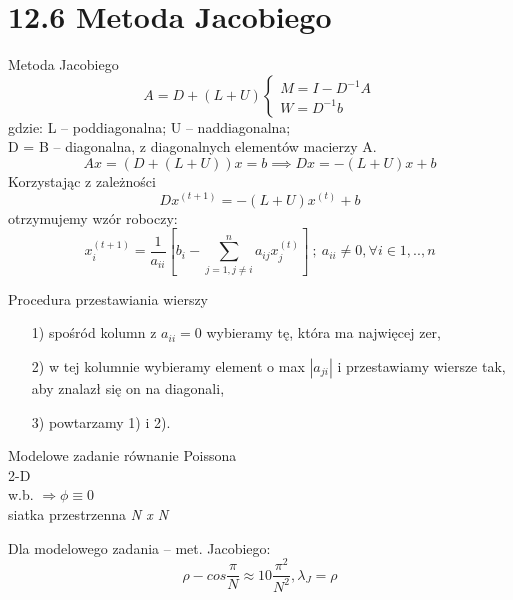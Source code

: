 \section{12.6 Metoda Jacobiego}

\begin{frame}{Metoda Jacobiego}
  $$
  A = D + (L+U)
  \begin{cases}
  M=I-D^{-1}A\\
  W=D^{-1}b
  \end{cases}
  $$
  gdzie: L -- poddiagonalna; U -- naddiagonalna;\\
  D = B -- diagonalna, z diagonalnych elementów macierzy A.
  $$Ax = (D+(L+U))x = b \implies Dx = -(L+U)x + b$$
  Korzystając z zależności
  $$\boxed{Dx^{(t+1)}= -(L+U)x^{(t)}+b}$$
  otrzymujemy wzór roboczy:
  $$x_i^{(t+1)}=\frac{1}{a_{ii}}[b_i-\sum_{j=1,j\neq i}^{n} a_{ij}x_j^{(t)}]\  ;\  a_{ii} \neq 0, \forall i \in {1,..,n} $$
\end{frame}

\begin{frame}
  \begin{block}{Procedura przestawiania wierszy}
    \begin{itemize}
      \item[1)] spośród kolumn z $a_{ii} = 0$ wybieramy tę, która ma najwięcej zer,
      \item[2)] w tej kolumnie wybieramy element o max $|a_{ji}|$ i przestawiamy wiersze tak, aby znalazł się on na diagonali,
      \item[3)] powtarzamy 1) i 2).
    \end{itemize}
  \end{block}
\end{frame}

\begin{frame}{}
  \begin{block}{Modelowe zadanie}
    równanie Poissona
    \\2-D
    \\w.b. $\Rightarrow\phi\equiv 0$
    \\siatka przestrzenna \emph{N x N}
  \end{block}

  \begin{block}{Dla modelowego zadania -- met. Jacobiego:}  %
    $$\rho - cos\frac{\pi}{N}\approx 1 0 \frac{\pi^2}{N^2}, \lambda _J = \rho$$
  \end{block}
\end{frame}

